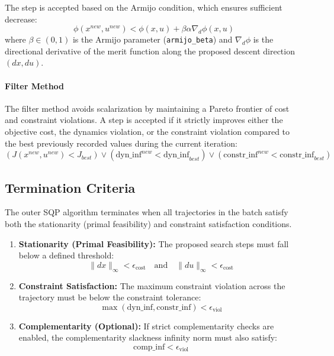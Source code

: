 \documentclass[11pt]{article}
\begin{document}
The step is accepted based on the Armijo condition, which ensures sufficient decrease:
\begin{equation}
    \phi(x^{new}, u^{new}) < \phi(x, u) + \beta \alpha \nabla_{d} \phi(x, u)
\end{equation}
where $\beta \in (0, 1)$ is the Armijo parameter (\texttt{armijo\_beta}) and $\nabla_d \phi$ is the directional derivative of the merit function along the proposed descent direction $(dx, du)$.

\paragraph{Filter Method}
The filter method avoids scalarization by maintaining a Pareto frontier of cost and constraint violations. A step is accepted if it strictly improves either the objective cost, the dynamics violation, or the constraint violation compared to the best previously recorded values during the current iteration:
\begin{equation}
    (J(x^{new}, u^{new}) < J_{best}) \lor (\text{dyn\_inf}^{new} < \text{dyn\_inf}_{best}) \lor (\text{constr\_inf}^{new} < \text{constr\_inf}_{best})
\end{equation}

\subsection{Termination Criteria}
The outer SQP algorithm terminates when all trajectories in the batch satisfy both the stationarity (primal feasibility) and constraint satisfaction conditions.
\begin{enumerate}
    \item \textbf{Stationarity (Primal Feasibility):} The proposed search steps must fall below a defined threshold:
    \begin{equation}
        \| dx \|_\infty < \epsilon_{\text{cost}} \quad \text{and} \quad \| du \|_\infty < \epsilon_{\text{cost}}
    \end{equation}
    \item \textbf{Constraint Satisfaction:} The maximum constraint violation across the trajectory must be below the constraint tolerance:
    \begin{equation}
        \max( \text{dyn\_inf}, \text{constr\_inf} ) < \epsilon_{\text{viol}}
    \end{equation}
    \item \textbf{Complementarity (Optional):} If strict complementarity checks are enabled, the complementarity slackness infinity norm must also satisfy:
    \begin{equation}
        \text{comp\_inf} < \epsilon_{\text{viol}}
    \end{equation}
\end{enumerate}
\end{document}
